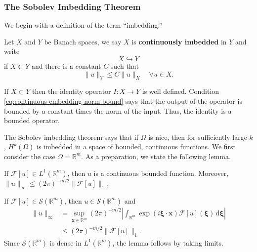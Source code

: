\subsubsection{The Sobolev Imbedding Theorem}\label{subsec:sobolev-imbedding-theorem}

We begin with a definition of the term ``imbedding.''

\begin{Definition}
\label{def:continuous-imbedding}
Let $X$ and $Y$ be Banach spaces, we say $X$ is \textbf{continuously imbedded} in $Y$ and write\[X\hookrightarrow Y\]if $X\subset Y$ and there is a constant $C$ such that
\begin{equation}\label{eq:continuous-embedding-norm-bound}
\|u\|_Y\leq C\|u\|_X\quad\forall u\in X.
\end{equation}

\end{Definition}

\begin{Remark}
\label{rem:continuous-imbedding-bounded-identity}
If $X\subset Y$ then the identity operator $I:X\to Y$ is well defined. Condition \eqref{eq:continuous-embedding-norm-bound} says that the output of the operator is bounded by a constant times the norm of the input. Thus, the identity is a bounded operator.
\end{Remark}

The Sobolev imbedding theorem says that if $\Omega$ is nice, then for sufficiently large $k$, $H^k(\Omega)$ is imbedded in a space of bounded, continuous functions. We first consider the case $\Omega=\mathbb{R}^m$. As a preparation, we state the following lemma.

\begin{Lemma}
\label{lem:integrable-fourier-transform-continuity}
If $\mathcal{F}[u]\in L^1(\mathbb{R}^m)$, then $u$ is a continuous bounded function. Moreover, $\|u\|_{\infty}\leq(2\pi)^{-m/2}\|\mathcal{F}[u]\|_1$.
\end{Lemma}

\begin{Proof}
If $\mathcal{F}[u]\in\mathcal{S}(\mathbb{R}^m)$, then $u\in\mathcal{S}(\mathbb{R}^m)$ and
\begin{equation}\label{eq:integrable-fourier-transform-uniform-bound}
\begin{aligned}
\|u\|_{\infty}&=\sup_{\bm{x}\in\mathbb{R}^m}(2\pi)^{-m/2}\left|\int_{\mathbb{R}^m}\exp(i\bm{\xi}\cdot\bm{x})\mathcal{F}[u](\bm{\xi})\,\mathrm{d}\bm{\xi}\right|\\
&\leq(2\pi)^{-m/2}\|\mathcal{F}[u]\|_1.
\end{aligned}
\end{equation}
Since $\mathcal{S}(\mathbb{R}^m)$ is dense in $L^1(\mathbb{R}^m)$, the lemma follows by taking limits.
\end{Proof}

